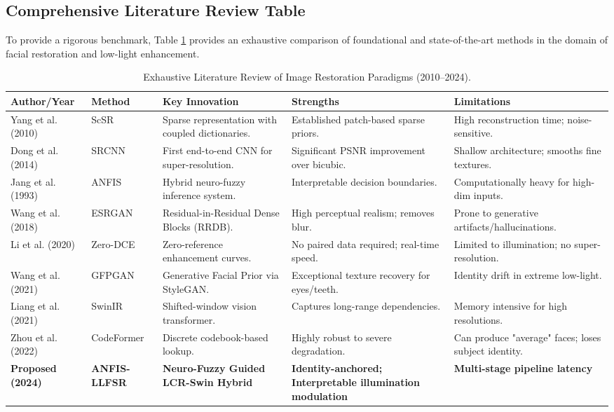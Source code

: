 \subsection{Comprehensive Literature Review Table}
To provide a rigorous benchmark, Table \ref{tab:detailed_lit} provides an exhaustive comparison of foundational and state-of-the-art methods in the domain of facial restoration and low-light enhancement.

\begin{table}[htbp]
    \centering
    \scriptsize
    \caption{Exhaustive Literature Review of Image Restoration Paradigms (2010--2024).}
    \label{tab:detailed_lit}
    \begin{tabular}{lp{1.5cm}p{2.5cm}p{3cm}p{3cm}}
        \toprule
        \textbf{Author/Year} & \textbf{Method} & \textbf{Key Innovation} & \textbf{Strengths} & \textbf{Limitations} \\
        \midrule
        Yang et al. (2010) & ScSR & Sparse representation with coupled dictionaries. & Established patch-based sparse priors. & High reconstruction time; noise-sensitive. \\
        Dong et al. (2014) & SRCNN & First end-to-end CNN for super-resolution. & Significant PSNR improvement over bicubic. & Shallow architecture; smooths fine textures. \\
        Jang et al. (1993) & ANFIS & Hybrid neuro-fuzzy inference system. & Interpretable decision boundaries. & Computationally heavy for high-dim inputs. \\
        Wang et al. (2018) & ESRGAN & Residual-in-Residual Dense Blocks (RRDB). & High perceptual realism; removes blur. & Prone to generative artifacts/hallucinations. \\
        Li et al. (2020) & Zero-DCE & Zero-reference enhancement curves. & No paired data required; real-time speed. & Limited to illumination; no super-resolution. \\
        Wang et al. (2021) & GFPGAN & Generative Facial Prior via StyleGAN. & Exceptional texture recovery for eyes/teeth. & Identity drift in extreme low-light. \\
        Liang et al. (2021) & SwinIR & Shifted-window vision transformer. & Captures long-range dependencies. & Memory intensive for high resolutions. \\
        Zhou et al. (2022) & CodeFormer & Discrete codebook-based lookup. & Highly robust to severe degradation. & Can produce "average" faces; loses subject identity. \\
        \midrule
        \textbf{Proposed (2024)} & \textbf{ANFIS-LLFSR} & \textbf{Neuro-Fuzzy Guided LCR-Swin Hybrid} & \textbf{Identity-anchored; Interpretable illumination modulation} & \textbf{Multi-stage pipeline latency} \\
        \bottomrule
    \end{tabular}
\end{table}

